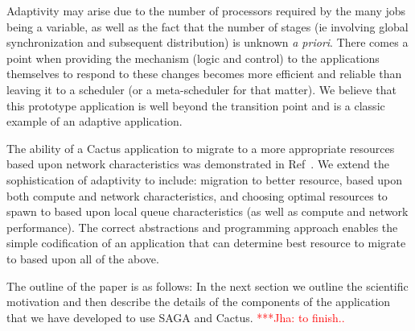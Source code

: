 \documentclass[conference,final]{IEEEtran}
\newcommand{\jhanote}[1]{ {\textcolor{red} { ***Jha: #1 }}}
\newcommand{\jhanote}[1]{}
\begin{document}
Adaptivity may arise due to the number of processors required by the
many jobs being a variable, as well as the fact that the number of
stages (ie involving global synchronization and subsequent
distribution) is unknown {\it a priori}. There comes a point when
providing the mechanism (logic and control) to the applications
themselves to respond to these changes becomes more efficient and
reliable than leaving it to a scheduler (or a meta-scheduler for that
matter). We believe that this prototype application is well beyond the
transition point and is a classic example of an adaptive application.

The ability of a Cactus application to migrate to a more appropriate
resources based upon network characteristics was demonstrated in
Ref~\cite{escience07}.  We extend the sophistication of adaptivity to
include: migration to better resource, based upon both compute and
network characteristics, and choosing optimal resources to spawn to
based upon local queue characteristics (as well as compute and network
performance). The correct abstractions and programming approach
enables the simple codification of an application that can determine
best resource to migrate to based upon all of the above.




The outline of the paper is as follows: In the next section we outline
the scientific motivation and then describe the details of the
components of the application that we have developed to use SAGA and
Cactus.  \jhanote{to finish..}
\end{document}

